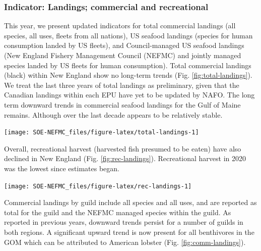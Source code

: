 \documentclass[
  10pt,
]{article}
\let\origfigure\figure
\let\endorigfigure\endfigure
\renewenvironment{figure}[1][2] {
    \expandafter\origfigure\expandafter[H]
} {
    \endorigfigure
}
\begin{document}
\hypertarget{indicator-landings-commercial-and-recreational}{%
\subsubsection{Indicator: Landings; commercial and recreational}\label{indicator-landings-commercial-and-recreational}}

This year, we present updated indicators for total commercial landings (all species, all uses, fleets from all nations), US seafood landings (species for human consumption landed by US fleets), and Council-managed US seafood landings (New England Fishery Management Council (NEFMC) and jointly managed species landed by US fleets for human consumption). Total commercial landings (black) within New England show no long-term trends (Fig. \ref{fig:total-landings}). We treat the last three years of total landings as preliminary, given that the Canadian landings within each EPU have yet to be updated by NAFO. The long term downward trends in commercial seafood landings for the Gulf of Maine remains. Although over the last decade appears to be relatively stable.

\begin{figure}

{\centering \texttt{[image: SOE-NEFMC\_files/figure-latex/total-landings-1]} 

}

\caption{Total commercial landings (black), total U.S. seafood landings (blue), and New England managed U.S. seafood landings (red) for Georges Bank and the Gulf of Maine.  Open circles represent years that are lacking NAFO (foreign) data. mt = metric tons}\label{fig:total-landings}
\end{figure}

Overall, recreational harvest (harvested fish presumed to be eaten) have also declined in New England (Fig. \ref{fig:rec-landings}). Recreational harvest in 2020 was the lowest since estimates began.

\begin{figure}

{\centering \texttt{[image: SOE-NEFMC\_files/figure-latex/rec-landings-1]} 

}

\caption{Total recreational seafood harvest (millions of pounds) in the New England region.}\label{fig:rec-landings}
\end{figure}

Commercial landings by guild include all species and all uses, and are reported as total for the guild and the NEFMC managed species within the guild. As reported in previous years, downward trends persist for a number of guilds in both regions. A significant upward trend is now present for all benthivores in the GOM which can be attributed to American lobster (Fig. \ref{fig:comm-landings}).
\end{document}

